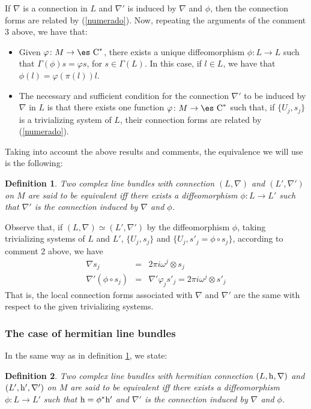 \documentclass[12pt]{article}
\theoremstyle{plain}
\newtheorem{definition}{Definition}
\def\beann{\begin{eqnarray*}}
\def\eeann{\end{eqnarray*}}
\def\h{{\rm h}}
\def\Complex{\mbox{\es C}}
\begin{document}
\begin{enumerate}
If $\nabla$ is a connection in $L$ and
$\nabla '$ is induced by $\nabla$ and $\phi$,
then the connection forms are related by (\ref{numerado}).
Now, repeating the arguments of the comment 3 above, we have that:
\begin{itemize}
\item
Given $\varphi \colon M \to \Complex^*$,
there exists a unique diffeomorphism
$\phi \colon L \to L$
such that $\Gamma (\phi )s = \varphi s$,
for $s \in \Gamma (L)$.
In this case, if $l \in L$,
we have that $\phi (l) = \varphi (\pi (l))l$.
\item
The necessary and sufficient condition for
the connection $\nabla '$ to be induced by
$\nabla$ in $L$ is that there exists one function
$\varphi \colon M \to \Complex^*$
such that, if $\{ U_j,s_j \}$ is a trivializing system of $L$,
their connection forms are related by (\ref{numerado}).
\end{itemize}
\end{enumerate}

Taking into account the above results and comments,
the equivalence we will use is the following:

\begin{definition}
Two complex line bundles with connection
$(L,\nabla )$ and $(L',\nabla ')$ on $M$
are said to be
{\rm equivalent}
iff there exists a diffeomorphism
$\phi \colon L \to L'$
such that $\nabla '$ is the connection induced
by $\nabla$ and $\phi$.
\label{lbce}
\end{definition}

Observe that, if
$(L,\nabla ) \simeq (L',\nabla ')$
by the diffeomorphism $\phi$,
taking trivializing systems of $L$ and $L'$,
$\{ U_j,s_j \}$ and $\{ U_j,s'_j=\phi \circ s_j \}$,
according to comment 2 above, we have
\beann
\nabla s_j
&=&
2\pi i \omega^j \otimes s_j
\\
\nabla ' (\phi \circ s_j)
&=&
\nabla' \varphi_j s'_j = 2\pi i \omega^j \otimes s'_j
\eeann
That is, the local connection forms associated with
$\nabla$ and $\nabla '$ are the same
with respect to the given trivializing systems.


\subsubsection{The case of hermitian line bundles}


In the same way as in definition \ref{lbce}, we state:

\begin{definition}
Two complex line bundles with hermitian connection
$(L,\h ,\nabla )$ and
$(L',\h ',\nabla ')$ on $M$
are said to be {\rm equivalent}
iff there exists a diffeomorphism
$\phi \colon L \to L'$ such that
$\h = \phi^*\h '$ and $\nabla '$
is the connection induced by $\nabla$ and $\phi$.
\label{clbhc}
\end{definition}
\end{document}
